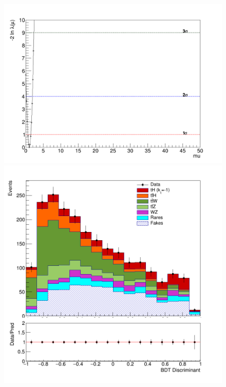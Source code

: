 \begin{linenumbers}
\begin{figure}[!htbp]
\begin{minipage}[b]{0.48\textwidth}
		\includegraphics[width=\textwidth]{Chapter4/kt-1/150fb/Likelihood.png}
	\end{minipage}
	\begin{minipage}[b]{0.48\textwidth}
		\includegraphics[width=\textwidth]{Chapter4/kt-1/300fb/simple-300-kt-1.png}
	\end{minipage}
	\hfill
	\begin{minipage}[b]{0.48\textwidth}

\end{minipage}
\end{figure}
\end{linenumbers}
